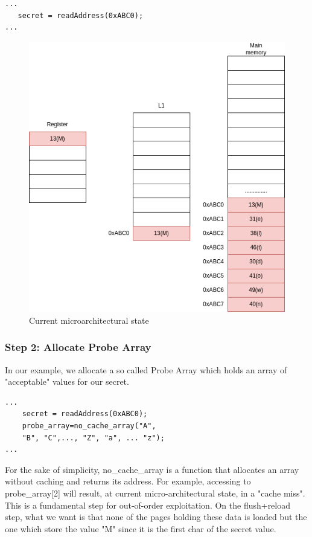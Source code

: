 \begin{Verbatim}[fontsize=\small]
...
   secret = readAddress(0xABC0);
...
\end{Verbatim}
\begin{figure}[!h]
    \includegraphics[scale=0.25]{img/meltdown-step-one.png}
    \caption{Current microarchitectural state}
\end{figure}

\subsubsection{Step 2: Allocate Probe Array}
In our example, we allocate a so called Probe Array which holds an array of "acceptable" values for our secret.
\begin{Verbatim}[fontsize=\small]
...
    secret = readAddress(0xABC0);
    probe_array=no_cache_array("A",
	"B", "C",..., "Z", "a", ... "z");
...
\end{Verbatim}
For the sake of simplicity, no\_cache\_array is a function that allocates an array without caching and returns its address.
For example, accessing to probe\_array[2] will result, at current micro-architectural state, in a "cache miss".
This is a fundamental step for out-of-order exploitation.
On the flush+reload step, what we want is that none of the pages holding these data is loaded but the one which store the value
"M" since it is the first char of the secret value.

